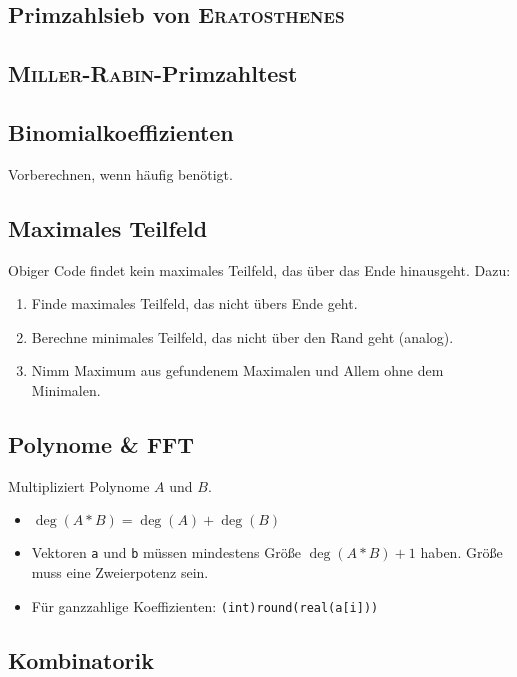 \subsection{Primzahlsieb von \textsc{Eratosthenes}}


\subsection{\textsc{Miller}-\textsc{Rabin}-Primzahltest}


\subsection{Binomialkoeffizienten}
Vorberechnen, wenn häufig benötigt.


\subsection{Maximales Teilfeld}

Obiger Code findet kein maximales Teilfeld, das über das Ende hinausgeht. Dazu:
\begin{enumerate}
	\item Finde maximales Teilfeld, das nicht übers Ende geht.
	\item Berechne minimales Teilfeld, das nicht über den Rand geht (analog).
	\item Nimm Maximum aus gefundenem Maximalen und Allem ohne dem Minimalen.
\end{enumerate}

\subsection{Polynome \& FFT}
Multipliziert Polynome $A$ und $B$.
\begin{itemize}
	\item $\deg(A * B) = \deg(A) + \deg(B)$
	\item Vektoren \lstinline{a} und \lstinline{b} müssen mindestens Größe
	$\deg(A * B) + 1$ haben.
	Größe muss eine Zweierpotenz sein.
	\item Für ganzzahlige Koeffizienten: \lstinline{(int)round(real(a[i]))}
\end{itemize}


\subsection{Kombinatorik}

